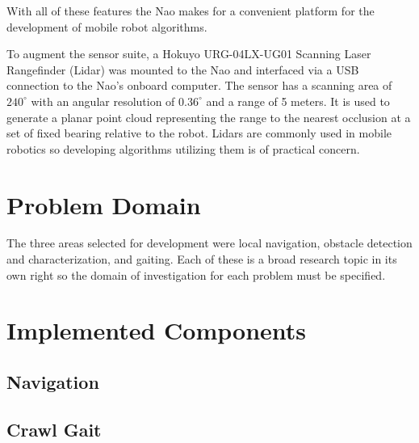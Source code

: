 With all of these features the Nao makes for a convenient platform for the development of mobile robot algorithms.

To augment the sensor suite, a Hokuyo URG-04LX-UG01 Scanning Laser Rangefinder (Lidar) was mounted to the Nao and
interfaced via a USB connection to the Nao's onboard computer. The sensor has a scanning area of $240^\circ$ with 
an angular resolution of $0.36^\circ$ and a range of 5 meters. It is used to generate a planar point cloud representing
the range to the nearest occlusion at a set of fixed bearing relative to the robot. Lidars are commonly used in mobile
robotics so developing algorithms utilizing them is of practical concern.

\section{Problem Domain}
The three areas selected for development were local navigation, obstacle detection and characterization, and gaiting.
Each of these is a broad research topic in its own right so the domain of investigation for each problem
must be specified. 

\section{Implemented Components}

\subsection{Navigation}
\subsection{Crawl Gait}

